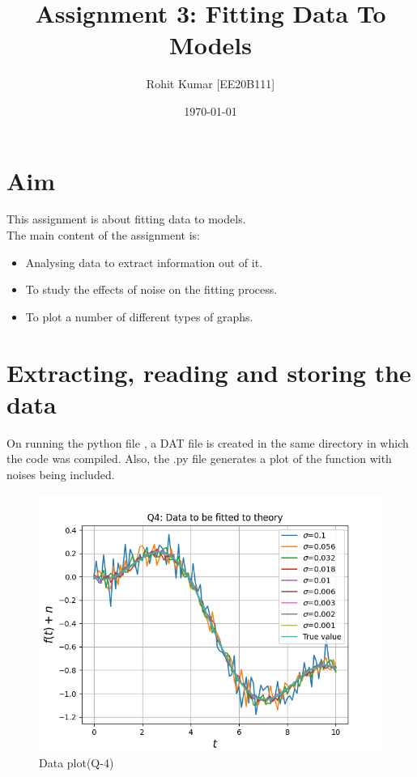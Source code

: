 \documentclass[11pt, a4paper]{article}
\title{Assignment 3: Fitting Data To Models} %
\author{Rohit Kumar [EE20B111]} %
\date{\today} %
\begin{document}
	
		
\maketitle %
\section*{Aim}
This assignment is about fitting data to models.\\
The main content of the assignment is: 
\begin{itemize}
\item Analysing data to extract information out of it.
\item To study the effects of noise on the fitting process.
\item To plot a number of different types of graphs. 
\end{itemize}

\section{Extracting, reading and storing the data}
On running the python file \textit{}, a DAT file \textit{} is created in the same directory in which the code was compiled. Also, the .py file generates a plot of the function with noises being included.

   \begin{figure}[!tbh]
   	\centering
   	\includegraphics[scale=0.5]{Figure_Q4.png}   
   	\caption{Data plot(Q-4)}
   	\label{fig:sample}
   \end{figure} 
   
\end{document}
